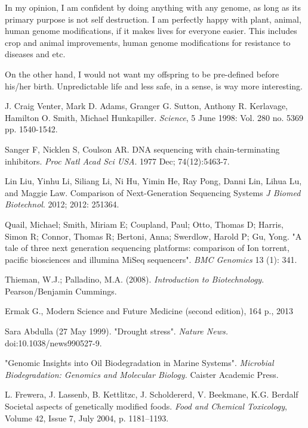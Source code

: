 \documentclass[english,11pt]{article}
\numberwithin{equation}{section}
\begin{document}
In my opinion, I am confident by doing anything with any genome, as long as its
primary purpose is not self destruction. I am perfectly happy with plant,
animal, human genome modifications, if it makes lives for everyone easier. This
includes crop and animal improvements, human genome modifications for resistance
to diseases and etc.

On the other hand, I would not want my offspring to be pre-defined before
his/her birth. Unpredictable life and less safe, in a sense, is way more
interesting.

\begin{thebibliography}{9}

        J. Craig Venter, Mark D. Adams, Granger G. Sutton, Anthony R. Kerlavage,
        Hamilton O. Smith, Michael Hunkapiller. \emph{Science}, 5 June 1998:
        Vol.  280 no. 5369 pp. 1540-1542.

        Sanger F, Nicklen S, Coulson AR. DNA sequencing with chain-terminating
        inhibitors. \emph{Proc Natl Acad Sci USA}. 1977 Dec; 74(12):5463-7.

        Lin Liu, Yinhu Li, Siliang Li, Ni Hu, Yimin He, Ray Pong, Danni Lin,
        Lihua Lu, and Maggie Law.  Comparison of Next-Generation Sequencing
        Systems \emph{J Biomed Biotechnol}. 2012; 2012: 251364.

        Quail, Michael; Smith, Miriam E; Coupland, Paul; Otto, Thomas D; Harris,
        Simon R; Connor, Thomas R; Bertoni, Anna; Swerdlow, Harold P; Gu, Yong.
        "A tale of three next generation sequencing platforms: comparison of Ion
        torrent, pacific biosciences and illumina MiSeq sequencers". \emph{BMC
        Genomics} 13 (1): 341.

        Thieman, W.J.; Palladino, M.A. (2008). \emph{Introduction to
        Biotechnology}. Pearson/Benjamin Cummings. 

        Ermak G., Modern Science and Future Medicine (second edition), 164 p.,
        2013

        Sara Abdulla (27 May 1999). "Drought stress". \emph{Nature News.}
        doi:10.1038/news990527-9.

        "Genomic Insights into Oil Biodegradation in Marine Systems".
        \emph{Microbial Biodegradation: Genomics and Molecular Biology.} Caister
        Academic Press.

        L. Frewera, J. Lassenb, B. Kettlitzc, J. Scholdererd, V. Beekmane, K.G.
        Berdalf Societal aspects of genetically modified foods. \emph{Food and
        Chemical Toxicology}, Volume 42, Issue 7, July 2004, p. 1181–1193.

\end{thebibliography}
\end{document}
